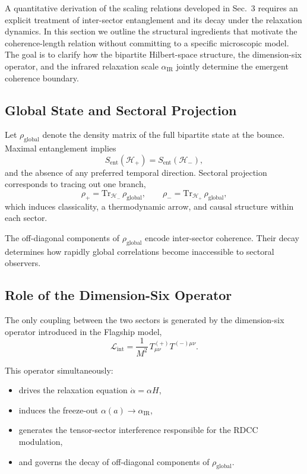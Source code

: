 \documentclass[11pt,a4paper]{article}
\begin{document}
A quantitative derivation of the scaling relations developed in Sec.~3 requires an explicit
treatment of inter-sector entanglement and its decay under the relaxation dynamics. In this
section we outline the structural ingredients that motivate the coherence-length relation
without committing to a specific microscopic model. The goal is to clarify how the bipartite
Hilbert-space structure, the dimension-six operator, and the infrared relaxation scale
$\alpha_{\mathrm{IR}}$ jointly determine the emergent coherence boundary.

\subsection{Global State and Sectoral Projection}

Let $\rho_{\mathrm{global}}$ denote the density matrix of the full bipartite state at the bounce.
Maximal entanglement implies
\begin{equation}
    S_{\mathrm{ent}}(\mathcal{H}_{+}) = S_{\mathrm{ent}}(\mathcal{H}_{-}),
\end{equation}
and the absence of any preferred temporal direction. Sectoral projection corresponds to
tracing out one branch,
\begin{equation}
    \rho_{+} = \mathrm{Tr}_{\mathcal{H}_{-}}\,\rho_{\mathrm{global}}, 
    \qquad
    \rho_{-} = \mathrm{Tr}_{\mathcal{H}_{+}}\,\rho_{\mathrm{global}},
\end{equation}
which induces classicality, a thermodynamic arrow, and causal structure within each sector.

The off-diagonal components of $\rho_{\mathrm{global}}$ encode inter-sector coherence. Their
decay determines how rapidly global correlations become inaccessible to sectoral observers.

\subsection{Role of the Dimension-Six Operator}

The only coupling between the two sectors is generated by the dimension-six operator
introduced in the Flagship model,
\begin{equation}
    \mathcal{L}_{\mathrm{int}}
    = \frac{1}{M^{2}}\,T^{(+)}_{\mu\nu} T^{(-)\mu\nu}.
\end{equation}

This operator simultaneously:
\begin{itemize}
    \item drives the relaxation equation $\dot{\alpha} = \alpha H$,
    \item induces the freeze-out $\alpha(a) \rightarrow \alpha_{\mathrm{IR}}$,
    \item generates the tensor-sector interference responsible for the RDCC modulation,
    \item and governs the decay of off-diagonal components of $\rho_{\mathrm{global}}$.
\end{itemize}
\end{document}
